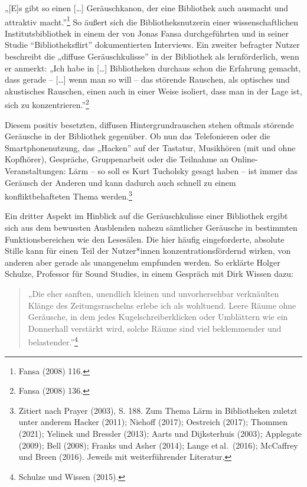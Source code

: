 \documentclass[a4paper,
fontsize=11pt,
oneside,
numbers=noperiodatend,
parskip=half-,
bibliography=totoc,
final
]{scrartcl}
\begin{document}
„{[}E{]}s gibt so einen {[}\ldots{]} Geräuschkanon, der eine Bibliothek
auch ausmacht und attraktiv macht.''\footnote{Fansa (2008) 116.} So
äußert sich die Bibliotheksnutzerin einer wissenschaftlichen
Institutsbibliothek in einem der von Jonas Fansa durchgeführten und in
seiner Studie \enquote{Bibliotheksflirt} dokumentierten Interviews. Ein
zweiter befragter Nutzer beschreibt die „diffuse Geräuschkulisse'' in
der Bibliothek als lernförderlich, wenn er anmerkt: „Ich habe in
{[}\ldots{]} Bibliotheken durchaus schon die Erfahrung gemacht, dass
gerade -- {[}\ldots{]} wenn man so will -- das störende Rauschen, als
optisches und akustisches Rauschen, einen auch in einer Weise isoliert,
dass man in der Lage ist, sich zu konzentrieren.''\footnote{Fansa (2008)
  136.}

Diesem positiv besetzten, diffusen Hintergrundrauschen stehen oftmals
störende Geräusche in der Bibliothek gegenüber. Ob nun das Telefonieren
oder die Smartphonenutzung, das „Hacken'' auf der Tastatur, Musikhören
(mit und ohne Kopfhörer), Gespräche, Gruppenarbeit oder die Teilnahme an
Online-Veranstaltungen: Lärm -- so soll es Kurt Tucholsky gesagt haben
-- ist immer das Geräusch der Anderen und kann dadurch auch schnell zu
einem konfliktbehafteten Thema werden.\footnote{Zitiert nach Prayer
  (2003), S. 188. Zum Thema Lärm in Bibliotheken zuletzt unter anderem
  Hacker (2011); Niehoff (2017); Oestreich (2017); Thommen (2021);
  Yelinek und Bressler (2013); Aarts und Dijksterhuis (2003); Applegate
  (2009); Bell (2008); Franks und Asher (2014); Lange et\,al.~(2016);
  McCaffrey und Breen (2016). Jeweils mit weiterführender Literatur.}

Ein dritter Aspekt im Hinblick auf die Geräuschkulisse einer Bibliothek
ergibt sich aus dem bewussten Ausblenden nahezu sämtlicher Geräusche in
bestimmten Funktionsbereichen wie den Lesesälen. Die hier häufig
eingeforderte, absolute Stille kann für einen Teil der Nutzer*innen
konzentrationsfördernd wirken, von anderen aber gerade als unangenehm
empfunden werden. So erklärte Holger Schulze, Professor für Sound
Studies, in einem Gespräch mit Dirk Wissen dazu:

\begin{quote}
„Die eher sanften, unendlich kleinen und unvorhersehbar verknäulten
Klänge des Zeitungsraschelns erlebe ich als wohltuend. Leere Räume ohne
Geräusche, in dem jedes Kugelschreiberklicken oder Umblättern wie ein
Donnerhall verstärkt wird, solche Räume sind viel beklemmender und
belastender.''\footnote{Schulze und Wissen (2015).}
\end{quote}
\end{document}
